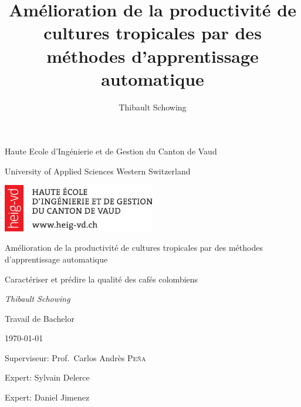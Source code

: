 \documentclass[11pt,a4paper]{report}
\author{Thibault Schowing}
\title{Amélioration de la productivité de cultures tropicales par des méthodes d'apprentissage automatique}
\newcommand\blankpage{%
	\null
	\thispagestyle{empty}%
	\addtocounter{page}{-1}%
	\newpage}
\begin{document}
	
	\begin{titlepage}
		\centering
		
		
		\small{Haute Ecole d'Ingénierie et de Gestion du Canton de Vaud  \par}
		\footnotesize{University of Applied Sciences Western Switzerland\par}
		\vspace{1cm}
		
		\includegraphics[width=0.5\textwidth]{HEIG-VD_Logo}\par
		
		\vspace{1cm}
		\Large{Amélioration de la productivité de cultures tropicales par des méthodes d'apprentissage automatique\par}
		\vspace{1.5cm}
		\small{Caractériser et prédire la qualité des cafés colombiens \par}
		\vspace{2cm}
		\small\textit{Thibault Schowing}\par
		\small{Travail de Bachelor}\par
		\small{\today\par}
		
		\vfill
		Superviseur: Prof.~Carlos Andrès \textsc{Peña}\par
		Expert: Sylvain Delerce \par
		Expert: Daniel Jimenez
		
		
	\end{titlepage}
	
	\afterpage{\blankpage}

	
	
	\afterpage{\blankpage}
	
	
	
	\afterpage{\blankpage}
	
	\tableofcontents
	
	\afterpage{\blankpage}
	
	
	
	
	
	
	
	{}
	
	
	
\end{document}
